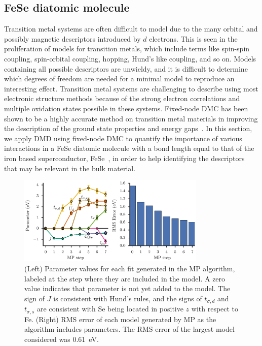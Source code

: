 \documentclass[aps, prb, 11pt]{revtex4-1}
\begin{document}
\subsection{FeSe diatomic molecule}
\label{subsection:fese}
Transition metal systems are often difficult to model due to the many orbital and possibly magnetic descriptors introduced by $d$ electrons. 
This is seen in the proliferation of models for transition metals, which include terms like spin-spin coupling, spin-orbital coupling, hopping, Hund's like coupling, and so on. 
Models containing all possible descriptors are unwieldy, and it is difficult to determine which degrees of freedom are needed for a minimal model to reproduce an interesting effect. 
Transition metal systems are challenging to describe using most electronic structure methods because of the strong electron correlations and multiple oxidation states possible in these systems. 
Fixed-node DMC has been shown to be a highly accurate method on transition metal materials in improving the description of the ground state properties and energy gaps~\cite{Foyevtsova2014, Wagner_Abbamonte, Zheng2015, Wagner2016}. In this section, we apply DMD using fixed-node DMC to quantify the importance of various interactions in a FeSe diatomic molecule with a bond length equal to that of the iron based superconductor, FeSe~\cite{kumar_crystal_2010}, in order to help identifying the descriptors that may be relevant in the bulk material.
\begin{figure}[htb]
  \centering
  \includegraphics[width=0.8\textwidth]{./Figures/fese.eps}
  \caption{
    \label{fig:fese} 
    (Left) Parameter values for each fit generated in the MP algorithm, labeled at the step where they are included in the model. 
    A zero value indicates that parameter is not yet added to the model.
    The sign of $J$ is consistent with Hund's rules, and the signs of $t_{\sigma,d}$ and $t_{\sigma,s}$ are consistent with Se being located in positive $z$ with respect to Fe. 
    (Right) RMS error of each model generated by MP as the algorithm includes parameters. 
    The RMS error of the largest model considered was 0.61~eV.
  }
\end{figure}
\end{document}
